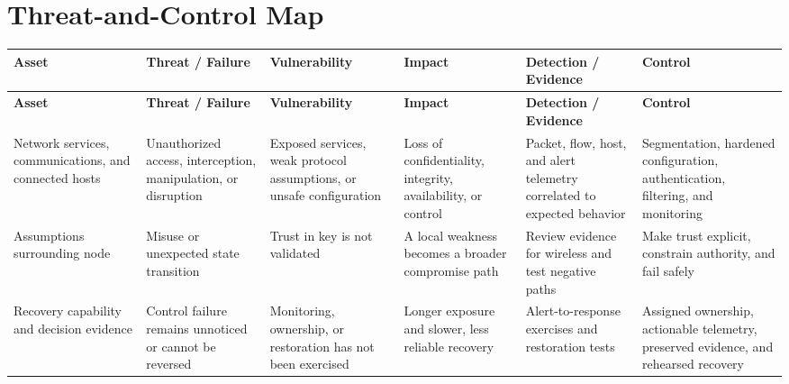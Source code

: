 \documentclass[11pt]{article}
\begin{document}
\section*{Threat-and-Control Map}
\begingroup\scriptsize\setlength{\tabcolsep}{2pt}
\begin{longtable}{>{\RaggedRight\arraybackslash}p{}>{\RaggedRight\arraybackslash}p{}>{\RaggedRight\arraybackslash}p{}>{\RaggedRight\arraybackslash}p{}>{\RaggedRight\arraybackslash}p{}>{\RaggedRight\arraybackslash}p{}}
\toprule\rowcolor{Navy}\color{white}\textbf{Asset} & \color{white}\textbf{Threat / Failure} & \color{white}\textbf{Vulnerability} & \color{white}\textbf{Impact} & \color{white}\textbf{Detection / Evidence} & \color{white}\textbf{Control}\\\midrule
\endfirsthead
\toprule\rowcolor{Navy}\color{white}\textbf{Asset} & \color{white}\textbf{Threat / Failure} & \color{white}\textbf{Vulnerability} & \color{white}\textbf{Impact} & \color{white}\textbf{Detection / Evidence} & \color{white}\textbf{Control}\\\midrule
\endhead
Network services, communications, and connected hosts & Unauthorized access, interception, manipulation, or disruption & Exposed services, weak protocol assumptions, or unsafe configuration & Loss of confidentiality, integrity, availability, or control & Packet, flow, host, and alert telemetry correlated to expected behavior & Segmentation, hardened configuration, authentication, filtering, and monitoring\\\midrule
Assumptions surrounding node & Misuse or unexpected state transition & Trust in key is not validated & A local weakness becomes a broader compromise path & Review evidence for wireless and test negative paths & Make trust explicit, constrain authority, and fail safely\\\midrule
Recovery capability and decision evidence & Control failure remains unnoticed or cannot be reversed & Monitoring, ownership, or restoration has not been exercised & Longer exposure and slower, less reliable recovery & Alert-to-response exercises and restoration tests & Assigned ownership, actionable telemetry, preserved evidence, and rehearsed recovery\\\midrule
\bottomrule
\end{longtable}
\endgroup
\end{document}

